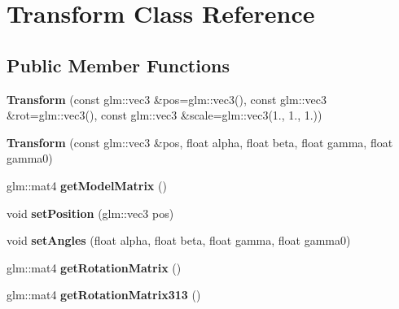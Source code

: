 \hypertarget{classTransform}{\section{Transform Class Reference}
\label{classTransform}
}
\subsection*{Public Member Functions}
\begin{DoxyCompactItemize}
\item 
\hypertarget{classTransform_ac817818cbef0394187b0d68c7d717fc9}{{\bfseries Transform} (const glm\-::vec3 \&pos=glm\-::vec3(), const glm\-::vec3 \&rot=glm\-::vec3(), const glm\-::vec3 \&scale=glm\-::vec3(1., 1., 1.))}\label{classTransform_ac817818cbef0394187b0d68c7d717fc9}

\item 
\hypertarget{classTransform_ad14e03bcc1b524516c163918e5a63895}{{\bfseries Transform} (const glm\-::vec3 \&pos, float alpha, float beta, float gamma, float gamma0)}\label{classTransform_ad14e03bcc1b524516c163918e5a63895}

\item 
\hypertarget{classTransform_af0671190bf3f3b4e5cdd8ccb23c05a7a}{glm\-::mat4 {\bfseries get\-Model\-Matrix} ()}\label{classTransform_af0671190bf3f3b4e5cdd8ccb23c05a7a}

\item 
\hypertarget{classTransform_ac1800c0a78b38122d8de320c57b30b41}{void {\bfseries set\-Position} (glm\-::vec3 pos)}\label{classTransform_ac1800c0a78b38122d8de320c57b30b41}

\item 
\hypertarget{classTransform_ad86ffe794fc73c9b79f5111023d43099}{void {\bfseries set\-Angles} (float alpha, float beta, float gamma, float gamma0)}\label{classTransform_ad86ffe794fc73c9b79f5111023d43099}

\item 
\hypertarget{classTransform_a716f060a18db568786ae023e8c02597c}{glm\-::mat4 {\bfseries get\-Rotation\-Matrix} ()}\label{classTransform_a716f060a18db568786ae023e8c02597c}

\item 
\hypertarget{classTransform_a13da002397c1b19257aeecab4a538230}{glm\-::mat4 {\bfseries get\-Rotation\-Matrix313} ()}\label{classTransform_a13da002397c1b19257aeecab4a538230}

\end{DoxyCompactItemize}
